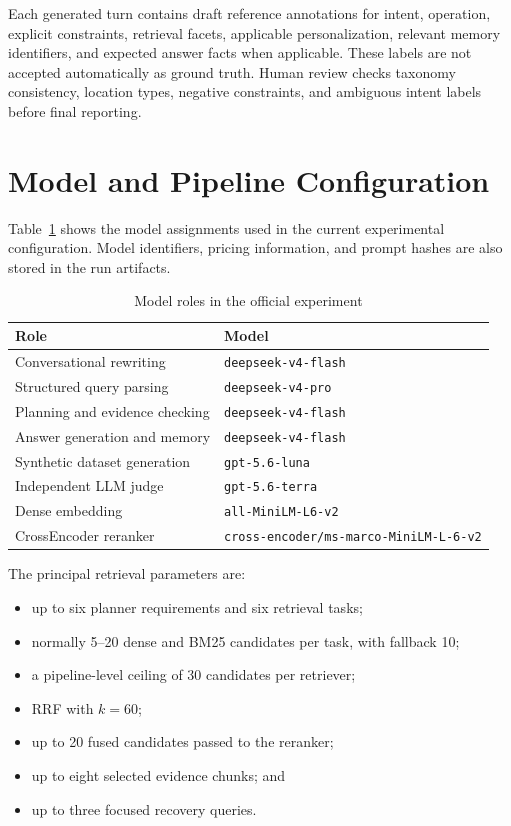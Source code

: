 Each generated turn contains draft reference annotations for intent, operation,
explicit constraints, retrieval facets, applicable personalization, relevant
memory identifiers, and expected answer facts when applicable. These labels are
not accepted automatically as ground truth. Human review checks taxonomy
consistency, location types, negative constraints, and ambiguous intent labels
before final reporting.

\section{Model and Pipeline Configuration}

Table~\ref{tab:model-roles-experiment} shows the model assignments used in the
current experimental configuration. Model identifiers, pricing information,
and prompt hashes are also stored in the run artifacts.

\begin{table}[H]
\centering
\caption{Model roles in the official experiment}
\label{tab:model-roles-experiment}
\begin{tabular}{p{} p{}}
\hline
\textbf{Role} & \textbf{Model} \\
\hline
Conversational rewriting & \texttt{deepseek-v4-flash} \\
Structured query parsing & \texttt{deepseek-v4-pro} \\
Planning and evidence checking & \texttt{deepseek-v4-flash} \\
Answer generation and memory & \texttt{deepseek-v4-flash} \\
Synthetic dataset generation & \texttt{gpt-5.6-luna} \\
Independent LLM judge & \texttt{gpt-5.6-terra} \\
Dense embedding & \texttt{all-MiniLM-L6-v2} \\
CrossEncoder reranker & \texttt{cross-encoder/ms-marco-MiniLM-L-6-v2} \\
\hline
\end{tabular}
\end{table}

The principal retrieval parameters are:

\begin{itemize}
    \item up to six planner requirements and six retrieval tasks;
    \item normally 5--20 dense and BM25 candidates per task, with fallback 10;
    \item a pipeline-level ceiling of 30 candidates per retriever;
    \item RRF with $k=60$;
    \item up to 20 fused candidates passed to the reranker;
    \item up to eight selected evidence chunks; and
    \item up to three focused recovery queries.
\end{itemize}

